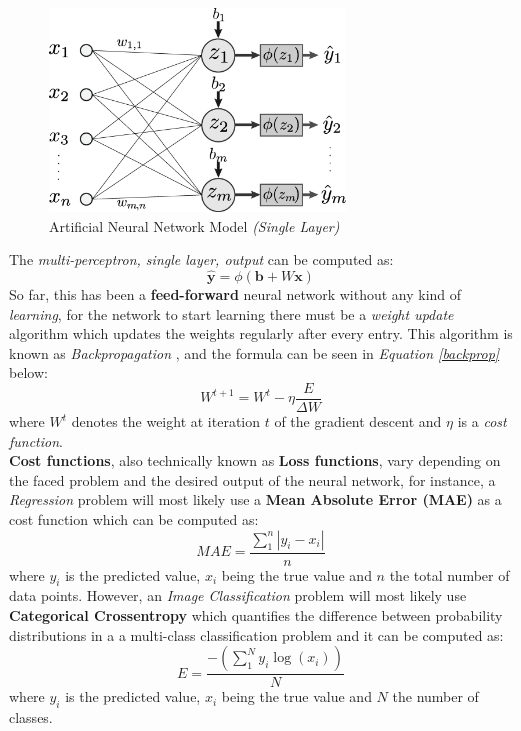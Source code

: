 \documentclass[12pt]{extarticle}
\begin{document}
	\begin{figure}[h]
	\centering
	\includegraphics[width=0.7\textwidth]{pics/Figures/ANN.eps}
	\caption{\small{Artificial Neural Network Model \emph{(Single Layer)}}}
	\label{fig:ANN}
	\end{figure}

	The \emph{multi-perceptron, single layer, output} can be computed as:
	\begin{equation}\label{y_hat}
		\bm{\hat{y}} = \phi(\bm{b}+ W\bm{x})
	\end{equation}
	So far, this has been a \textbf{feed-forward} neural network without any kind of \emph{learning}, for the network to start learning there must be a \emph{weight update} algorithm which updates the weights regularly after every entry. This algorithm is known as \emph{Backpropagation} \cite{backprop}, and the formula can be seen in \emph{Equation \ref{backprop}} below: 
	\begin{equation}\label{backprop}
		W^{t+1} = W^{t} - \eta\dfrac{E}{\Delta{W}}
	\end{equation}
	where $W^{t}$ denotes the weight at iteration $t$ of the gradient descent and $\eta$ is a \emph{cost function}.\\[5mm]
	\textbf{Cost functions}, also technically known as \textbf{Loss functions}, vary depending on the faced problem and the desired output of the neural network, for instance, a \emph{Regression} problem will most likely use a \textbf{Mean Absolute Error (MAE)}\cite{qi2020mean} as a cost function which can be computed as:
	\begin{equation}\label{MAE}
		MAE = \dfrac{\sum_{1}^{n}|y_i-x_i|}{n}
	\end{equation}
	where $y_i$ is the predicted value, $x_i$ being the true value and $n$ the total number of data points. However, an \emph{Image Classification} problem will most likely use \textbf{Categorical Crossentropy}\cite{ho2019real} which quantifies the difference between probability distributions in a a multi-class classification problem and it can be computed as:
	\begin{equation}\label{crossentro}
		E = \dfrac{-(\sum_{1}^{N}y_i\log(x_i))}{N}
	\end{equation}
	where $y_i$ is the predicted value, $x_i$ being the true value and $N$ the number of classes.
\end{document}

